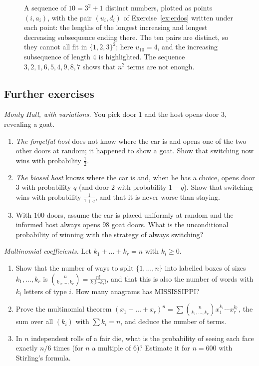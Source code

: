 \begin{figure}[ht]
\centering
{}
\caption{A sequence of $10=3^2+1$ distinct numbers, plotted as points $(i,a_i)$, with the pair $(u_i,d_i)$ of Exercise~\ref{ex:erdos} written under each point: the lengths of the longest increasing and longest decreasing subsequence ending there. The ten pairs are distinct, so they cannot all fit in $\{1,2,3\}^2$; here $u_{10}=4$, and the increasing subsequence of length $4$ is highlighted. The sequence $3,2,1,6,5,4,9,8,7$ shows that $n^2$ terms are not enough.}
\label{fig:erdos}
\end{figure}

\subsection*{Further exercises}

\begin{exercise}[$\star$]\label{ex:monty}
\emph{Monty Hall, with variations.} You pick door $1$ and the host opens door $3$, revealing a goat.
\begin{enumerate}[label=(\alph*)]
\item \emph{The forgetful host} does not know where the car is and opens one of the two other doors at random; it happened to show a goat. Show that switching now wins with probability $\frac12$.
\item \emph{The biased host} knows where the car is and, when he has a choice, opens door $3$ with probability $q$ (and door $2$ with probability $1-q$). Show that switching wins with probability $\frac1{1+q}$, and that it is never worse than staying.
\item With $100$ doors, assume the car is placed uniformly at random and the informed host always opens $98$ goat doors. What is the unconditional probability of winning with the strategy of always switching?
\end{enumerate}
\end{exercise}

\begin{exercise}[$\star$]\label{ex:multinomial}
\emph{Multinomial coefficients.} Let $k_1+\dots+k_r=n$ with $k_i\ge0$.
\begin{enumerate}[label=(\alph*)]
\item Show that the number of ways to split $\{1,\dots,n\}$ into labelled boxes of sizes $k_1,\dots,k_r$ is $\binom n{k_1,\dots,k_r}=\frac{n!}{k_1!\cdots k_r!}$, and that this is also the number of words with $k_i$ letters of type $i$. How many anagrams has MISSISSIPPI?
\item Prove the multinomial theorem $(x_1+\dots+x_r)^n=\sum\binom n{k_1,\dots,k_r}x_1^{k_1}\cdots x_r^{k_r}$, the sum over all $(k_i)$ with $\sum k_i=n$, and deduce the number of terms.
\item In $n$ independent rolls of a fair die, what is the probability of seeing each face exactly $n/6$ times (for $n$ a multiple of $6$)? Estimate it for $n=600$ with Stirling's formula.
\end{enumerate}
\end{exercise}

